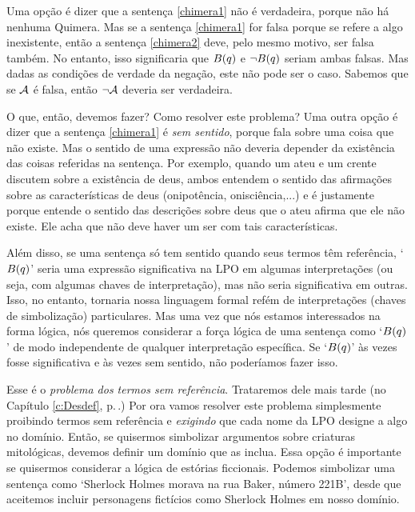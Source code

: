 Uma opção é dizer que a sentença \ref{chimera1} não é verdadeira, porque não há nenhuma Quimera. 
Mas se a sentença \ref{chimera1} for falsa porque se refere a algo inexistente, então a sentença \ref{chimera2} deve, pelo mesmo motivo, ser falsa também.
No entanto, isso significaria que $\mathord{B}(q)$ e $\neg \mathord{B}(q)$ seriam ambas falsas.
Mas dadas as condições de verdade da negação, este não pode ser o caso.
Sabemos que se $\mathcal{A}$ é falsa, então $\neg\mathcal{A}$ deveria ser verdadeira.

O que, então, devemos fazer? Como resolver este problema?
Uma outra opção é dizer que a sentença \ref{chimera1} é \emph{sem sentido}, porque fala sobre uma coisa que não existe.
Mas o sentido de uma expressão não deveria depender da existência das coisas referidas na sentença.
Por exemplo, quando um ateu e um crente discutem sobre a existência de deus, ambos entendem o sentido das afirmações sobre as características de deus (onipotência, onisciência,...) e é justamente porque entende o sentido das descrições sobre deus que o ateu afirma que ele não existe.
Ele acha que não deve haver um ser com tais características.
 
Além disso, se uma sentença só tem sentido quando seus termos têm referência, `$\mathord{B}(q)$' seria uma expressão significativa na LPO em algumas interpretações (ou seja, com algumas chaves de interpretação), mas não seria significativa em outras.
Isso, no entanto, tornaria nossa linguagem formal refém de interpretações (chaves de simbolização) particulares.
Mas uma vez que nós estamos interessados na forma lógica, nós queremos considerar a força lógica de uma sentença como `$\mathord{B}(q)$' de modo independente de qualquer interpretação específica.
Se `$\mathord{B}(q)$' às vezes fosse significativa e às vezes sem sentido, não poderíamos fazer isso.

Esse é o \emph{problema dos termos sem referência}.
Trataremos dele mais tarde (no Capítulo \ref{c:Desdef}, p.\,\pageref{c:Desdef}.)
Por ora vamos resolver este problema simplesmente proibindo termos sem referência e \emph{exigindo} que cada nome da LPO designe a algo no domínio.
Então, se quisermos simbolizar argumentos sobre criaturas mitológicas, devemos definir um domínio que as inclua.
Essa opção é importante se quisermos considerar a lógica de estórias ficcionais. Podemos simbolizar uma sentença como `Sherlock Holmes morava na rua Baker, número 221B', desde que aceitemos incluir personagens fictícios como Sherlock Holmes em nosso domínio.


